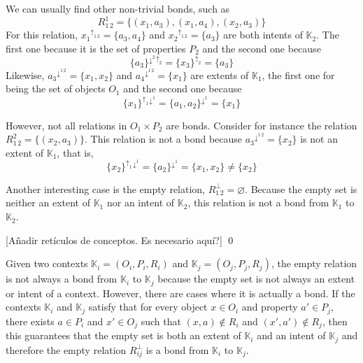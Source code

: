 \documentclass[runningheads,a4paper]{llncs}
\newcommand{\K}{\mathbb{K}}
\newcommand{\up}[1][]{{^{\uparrow_{#1}}}}
\newcommand{\down}[1][]{{^{\downarrow^{#1}}}}
\renewcommand{\emptyset}{\varnothing}
\newcommand{\editornote}[1]{{\color{red}[#1]}}
\newcommand{\cred}[1]{{\color{red} #1}}
\newcommand{\ct}[1]{\cred{\textst{#1}}}
\begin{document}
\begin{example}
We can usually find other non-trivial bonds, such as
\[
R_{1\,2}^1 = \{(x_1, a_3), (x_1, a_4), (x_2, a_3)\}
\]
For this relation, $x_1\up[1\,2] = \{a_3, a_4\}$ and $x_2\up[1\,2] = \{a_3\}$ are both intents of $\K_2$. The first one because it is the set of properties $P_2$ and the second one because
\[
\{a_3\}\down[2]\up[2] = \{x_3\}\up[2] = \{a_3\}
\]
Likewise, $a_3\down[1\,2] = \{x_1, x_2\}$ and $a_4\down[1\,2] = \{x_1\}$ are extents of $\K_1$, the first one for being the set of objects $O_1$ and the second one because
\[
\{x_1\}\up[1]\down[1] = \{a_1, a_2\}\down[1] = \{x_1\}
\]

However, not all relations in $O_1 \times P_2$ are bonds. Consider for instance the relation $R_{1\,2}^2 = \{(x_2, a_3)\}$. This relation is not a bond because $a_3\down[1\,2] = \{x_2\}$ is not an extent of $\K_1$, that is, 
\[
\{x_2\}\up[1]\down[1] = \{a_2\}\down[1] = \{x_1, x_2\} \neq \{x_2\}
\]


Another interesting case is the empty relation, $R_{1\,2}^\bot = \emptyset$. Because the empty set is neither an extent of $\K_1$ nor an intent of $\K_2$, this relation is not a bond from $\K_1$ to $\K_2$. 

\editornote{A\~nadir ret\'iculos de conceptos. Es necesario aqu\'i?}
\qed
\end{example}

\begin{remark}\label{rem:bottom-bond-crisp}

Given two contexts $\K_i = (O_i, P_i, R_i)$ and $\K_j = (O_j, P_j, R_j)$, the empty relation is not always a bond from $\K_i$ to $\K_j$ because the empty set \ct{isn't} is not always an extent or intent of a context. However, there are cases where it is actually a bond. If the contexts $\K_i$ and $\K_j$ satisfy that for every object $x \in O_i$ and property $a' \in P_j$, there exists $a \in P_i$ and $x' \in O_j$ such that $(x, a) \notin R_i$ and $(x', a') \notin R_j$, then this guarantees that the empty set is both an extent of $\K_i$ and an intent of $\K_j$ and therefore the empty relation $R_{ij}^\bot$ is a bond from $\K_i$ to $\K_j$.

\end{remark}
\end{document}
